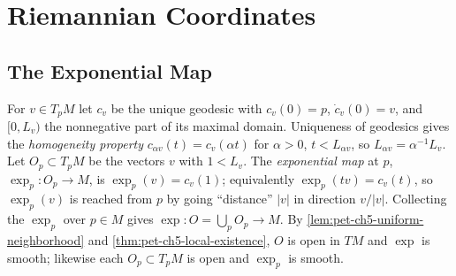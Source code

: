 \section{Riemannian Coordinates}

\subsection{The Exponential Map}

\begin{definition}
  \label{def:pet-ch5-exponential-map}


  For $v\in T_pM$ let $c_v$ be the unique geodesic with $c_v(0)=p$, $\dot c_v(0)=v$,
  and $[0,L_v)$ the nonnegative part of its maximal domain. Uniqueness of geodesics
  gives the \emph{homogeneity property} $c_{\alpha v}(t)=c_v(\alpha t)$ for
  $\alpha>0$, $t<L_{\alpha v}$, so $L_{\alpha v}=\alpha^{-1}L_v$. Let $O_p\subset
  T_pM$ be the vectors $v$ with $1<L_v$. The \emph{exponential map} at $p$,
  $\exp_p:O_p\to M$, is $\exp_p(v)=c_v(1)$; equivalently $\exp_p(tv)=c_v(t)$, so
  $\exp_p(v)$ is reached from $p$ by going ``distance'' $|v|$ in direction $v/|v|$.
  Collecting the $\exp_p$ over $p\in M$ gives $\exp:O=\bigcup_pO_p\to M$. By
  \cref{lem:pet-ch5-uniform-neighborhood} and
  \cref{thm:pet-ch5-local-existence}, $O$ is open in
  $TM$ and $\exp$ is smooth; likewise each $O_p\subset T_pM$ is open and $\exp_p$ is
  smooth.
\end{definition}

